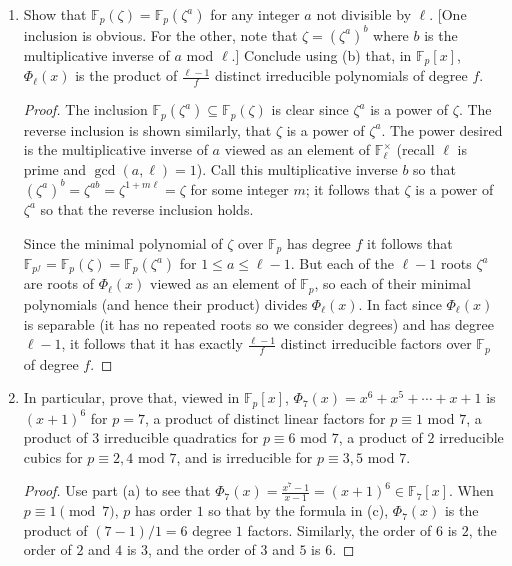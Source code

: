 \documentclass[11pt]{article}
\begin{document}
\begin{enumerate}
\begin{enumerate}
\begin{proof}
            Since $\mathbb{F}_{p^f}$ is a degree $f$ extension of $\mathbb{F}_p$ and $\zeta\in \mathbb{F}_{p^f}$, it follows that the minimal polynomial of $\zeta$ over $\mathbb{F}_p$ is degree $f$.
        \end{proof}
        \item Show that $\mathbb{F}_p(\zeta) = \mathbb{F}_p(\zeta^a)$ for any integer $a$ not divisible by $\ell$. [One inclusion is obvious. For the other, note that $\zeta = (\zeta^a)^b$ where $b$ is the multiplicative inverse of $a$ mod $\ell$.] Conclude using (b) that, in $\mathbb{F}_p[x]$, $\varPhi_\ell(x)$ is the product of $\frac{\ell-1}{f}$ distinct irreducible polynomials of degree $f$. \begin{proof}
            The inclusion $\mathbb{F}_p(\zeta^a)\subseteq \mathbb{F}_p(\zeta)$ is clear since $\zeta^a$ is a power of $\zeta$. The reverse inclusion is shown similarly, that $\zeta$ is a power of $\zeta^a$. The power desired is the multiplicative inverse of $a$ viewed as an element of $\mathbb{F}_\ell^\times$ (recall $\ell$ is prime and $\gcd(a,\ell) = 1$). Call this multiplicative inverse $b$ so that $(\zeta^a)^b = \zeta^{ab} = \zeta^{1+m\ell} = \zeta$ for some integer $m$; it follows that $\zeta$ is a power of $\zeta^a$ so that the reverse inclusion holds.

            Since the minimal polynomial of $\zeta$ over $\mathbb{F}_{p}$ has degree $f$ it follows that $\mathbb{F}_{p^f} = \mathbb{F}_p(\zeta) = \mathbb{F}_p(\zeta^a)$ for $1\leq a\leq \ell-1$. But each of the $\ell-1$ roots $\zeta^a$ are roots of $\varPhi_\ell(x)$ viewed as an element of $\mathbb{F}_p$, so each of their minimal polynomials (and hence their product) divides $\varPhi_\ell(x)$. In fact since $\varPhi_\ell(x)$ is separable (it has no repeated roots so we consider degrees) and has degree $\ell-1$, it follows that it has exactly $\frac{\ell-1}{f}$ distinct irreducible factors over $\mathbb{F}_p$ of degree $f$.
        \end{proof}
        \item In particular, prove that, viewed in $\mathbb{F}_p[x]$, $\varPhi_7(x) = x^6+x^5+\cdots + x+1$ is $(x+1)^6$ for $p = 7$, a product of distinct linear factors for $p\equiv 1$ mod $7$, a product of $3$ irreducible quadratics for $p \equiv 6$ mod $7$, a product of $2$ irreducible cubics for $p\equiv 2,4$ mod $7$, and is irreducible for $p\equiv 3,5$ mod $7$. \begin{proof}
            Use part (a) to see that $\varPhi_7(x) = \frac{x^7-1}{x-1} = (x+1)^6\in\mathbb{F}_7[x]$. When $p\equiv 1 \pmod 7$, $p$ has order $1$ so that by the formula in (c), $\varPhi_7(x)$ is the product of $(7-1)/1 = 6$ degree $1$ factors. Similarly, the order of $6$ is $2$, the order of $2$ and $4$ is $3$, and the order of $3$ and $5$ is $6$.


\end{proof}
\end{enumerate}
\end{enumerate}
\end{document}

